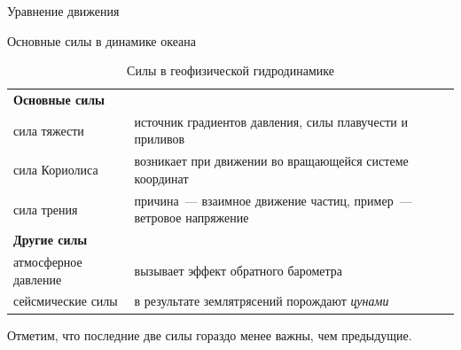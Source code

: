 \begin{chapter}{Уравнение движения}
\begin{section}{Основные силы в динамике океана}
\begin{table}
\caption{Силы в геофизической гидродинамике}\label{tbl:7.2}
\begin{tabular}{lp{}}
\hline
\textbf{Основные силы} \\
сила тяжести   & источник градиентов давления, силы плавучести и приливов\\
сила Кориолиса & возникает при движении во вращающейся системе координат\\
сила трения    & причина~--- взаимное движение частиц, 
                 пример~--- ветровое напряжение\\
\textbf{Другие силы} \\
атмосферное давление & вызывает эффект обратного барометра\\
сейсмические силы    & в результате землятрясений порождают \emph{цунами}\\
\hline
\end{tabular}
Отметим, что последние две силы гораздо менее важны, чем предыдущие.
\end{table}
%
\end{section}


\end{chapter}
